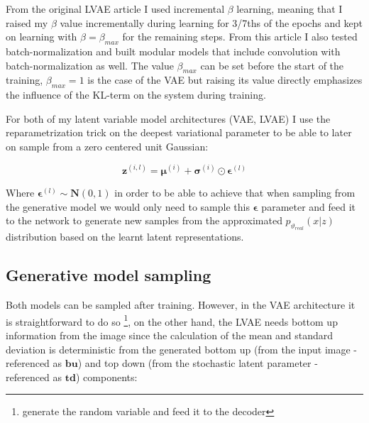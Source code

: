 \documentclass[12pt, english]{article}
\begin{document}
\par From the original LVAE article \cite{sonderby2016ladder} I used incremental $\beta$ learning, meaning that I raised my $\beta$ value incrementally during learning for 3/7ths of the epochs and kept on learning with $\beta = \beta_{max}$ for the remaining steps. From this article I also tested batch-normalization and built modular models that include convolution with batch-normalization as well. The value $\beta_{max}$ can be set before the start of the training, $\beta_{max} = 1$ is the case of the VAE but raising its value directly emphasizes the influence of the KL-term on the system during training.

\vspace{4mm}

\par For both of my latent variable model architectures (VAE, LVAE) I use the reparametrization trick on the deepest variational parameter to be able to later on sample from a zero centered unit Gaussian:

\vspace{4mm}

\begin{equation}
    \boldsymbol{\bm{z}}^{(i, l)} = \boldsymbol{\mu}^{(i)} + \boldsymbol{\sigma}^{(i)} \odot \boldsymbol{\bm{\epsilon}}^{(l)}
\end{equation}

\vspace{4mm}

\par Where $\boldsymbol{\bm{\epsilon}}^{(l)} \sim \boldsymbol{N}(0, 1)$ in order to be able to achieve that when sampling from the generative model we would only need to sample this $\bm{\epsilon}$ parameter and feed it to the network to generate new samples from the approximated $p_{\vartheta_{real}}(x | z)$ distribution based on the learnt latent representations.

\vspace{5mm}

\subsection{Generative model sampling}

\vspace{5mm}

\par Both models can be sampled after training. However, in the VAE architecture it is straightforward to do so \footnote{generate the random variable and feed it to the decoder}, on the other hand, the LVAE needs bottom up information from the image since the calculation of the mean and standard deviation is deterministic from the generated bottom up (from the input image - referenced as $\bm{bu}$) and top down (from the stochastic latent parameter - referenced as $\bm{td}$) components:
\end{document}
